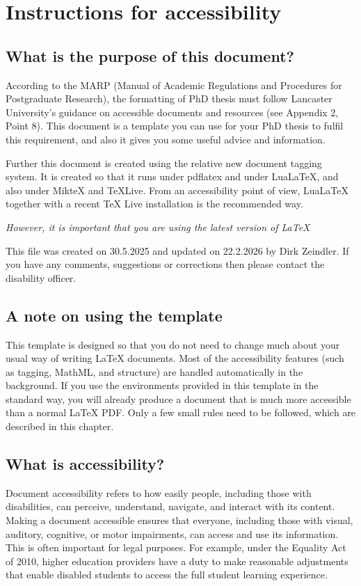 \chapter{Instructions for accessibility}


\section{What is the purpose of this document?}
%
According to the MARP (Manual of Academic Regulations and Procedures for Postgraduate Research), the formatting of PhD thesis must follow Lancaster University's guidance on accessible documents and resources (see Appendix 2, Point 8).
This document is a template you can use for your PhD thesis to fulfil this requirement, and also it gives you some useful advice and information.

Further this document is created using the relative new document tagging system. It is created so that it runs under pdflatex and under LuaLaTeX, and also under MikteX and TeXLive.
From an accessibility point of view, LuaLaTeX together with a recent TeX Live installation is the recommended way.
\begin{center}
\emph{However, it is important that  you are using the latest version of LaTeX}
\end{center}

This file was created on 30.5.2025 and updated on 22.2.2026 by Dirk Zeindler. If you have any comments, suggestions or corrections then please contact the disability officer.

\section{A note on using the template}

This template is designed so that you do not need to change much about your
usual way of writing \LaTeX{} documents.  Most of the accessibility features
(such as tagging, MathML, and structure) are handled automatically in the
background.  If you use the environments provided in this template in the
standard way, you will already produce a document that is much more accessible
than a normal \LaTeX{} PDF.  Only a few small rules need to be followed, which
are described in this chapter.


\section{What is accessibility?}
\label{sec:what-is-accessibility}
Document accessibility refers to how easily people, including those with disabilities, can perceive, understand, navigate, and interact with its content. Making a document accessible ensures that everyone, including those with visual, auditory, cognitive, or motor impairments, can access and use its information.
This is often important for legal purposes. For example, under the Equality Act of 2010, higher education providers have a duty to make reasonable adjustments that enable disabled students to access the full student learning experience.




